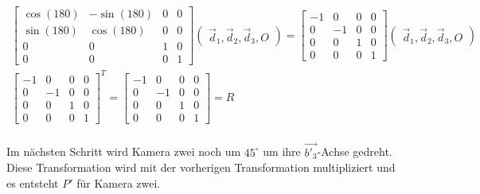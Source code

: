 \begin{gather}
	\begin{bmatrix}
		\cos(180)&-\sin(180)&0&0\\
		\sin(180)&\cos(180)&0&0\\
		0&0&1&0\\
		0&0&0&1
	\end{bmatrix}
	\begin{pmatrix}
		\vec{d}_1,\vec{d}_2,\vec{d}_3,O
	\end{pmatrix}
	=
	\begin{bmatrix}
		-1&0&0&0\\
		0&-1&0&0\\
		0&0&1&0\\
		0&0&0&1
	\end{bmatrix} 
	\begin{pmatrix}
		\vec{d}_1,\vec{d}_2,\vec{d}_3,O
	\end{pmatrix}\\
	\begin{bmatrix}
		-1&0&0&0\\
		0&-1&0&0\\
		0&0&1&0\\
		0&0&0&1
	\end{bmatrix}^T =\begin{bmatrix}
		-1&0&0&0\\
		0&-1&0&0\\
		0&0&1&0\\
		0&0&0&1
	\end{bmatrix}= R
\end{gather}\\

Im nächsten Schritt wird Kamera zwei noch um \ensuremath{45^\circ} um ihre $\vec{b'_3}$-Achse gedreht. Diese Transformation wird mit der vorherigen Transformation multipliziert und es entsteht $P'$ für Kamera zwei.

